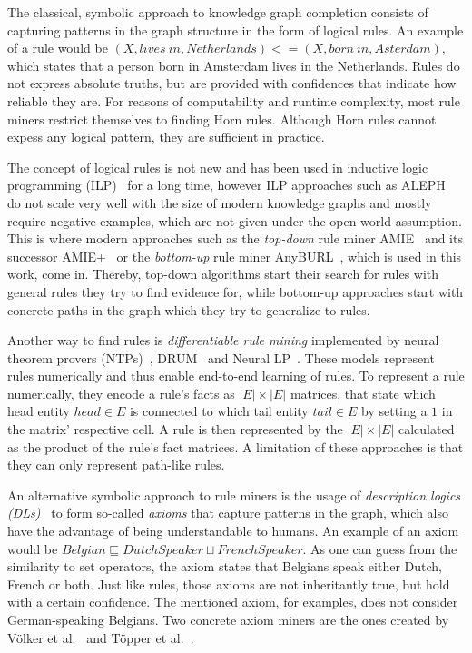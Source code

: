 The classical, symbolic approach to knowledge graph completion consists of capturing patterns in the graph structure in the form of logical rules. An example of a rule would be $(X, lives~in, Netherlands) <= (X, born~in, Asterdam)$, which states that a person born in Amsterdam lives in the Netherlands. Rules do not express absolute truths, but are provided with confidences that indicate how reliable they are. For reasons of computability and runtime complexity, most rule miners restrict themselves to finding Horn rules. Although Horn rules cannot expess any logical pattern, they are sufficient in practice.

The concept of logical rules is not new and has been used in inductive logic programming (ILP)~\cite{Muggleton1994InductiveLP} for a long time, however ILP approaches such as ALEPH~\cite{ALEPH} do not scale very well with the size of modern knowledge graphs and mostly require negative examples, which are not given under the open-world assumption. This is where modern approaches such as the \emph{top-down} rule miner AMIE~\cite{Galrraga2013AMIEAR} and its successor AMIE+~\cite{Galrraga2015FastRM} or the \emph{bottom-up} rule miner AnyBURL~\cite{Meilicke2019AnytimeBR}, which is used in this work, come in. Thereby, top-down algorithms start their search for rules with general rules they try to find evidence for, while bottom-up approaches start with concrete paths in the graph which they try to generalize to rules.

Another way to find rules is \emph{differentiable rule mining} implemented by neural theorem provers (NTPs)~\cite{Rocktschel2017EndtoendDP}, DRUM~\cite{Sadeghian2019DRUMED} and Neural LP~\cite{Yang2017DifferentiableLO}. These models represent rules numerically and thus enable end-to-end learning of rules. To represent a rule numerically, they encode a rule's facts as $|E| \times |E|$ matrices, that state which head entity $head \in E$ is connected to which tail entity $tail \in E$ by setting a $1$ in the matrix' respective cell. A rule is then represented by the $|E| \times |E|$ calculated as the product of the rule's fact matrices. A limitation of these approaches is that they can only represent path-like rules.

An alternative symbolic approach to rule miners is the usage of \emph{description logics (DLs)}~\cite{Baader2003TheDL} to form so-called \emph{axioms} that capture patterns in the graph, which also have the advantage of being understandable to humans. An example of an axiom would be $Belgian \sqsubseteq DutchSpeaker \sqcup FrenchSpeaker$. As one can guess from the similarity to set operators, the axiom states that Belgians speak either Dutch, French or both. Just like rules, those axioms are not inheritantly true, but hold with a certain confidence. The mentioned axiom, for examples, does not consider German-speaking Belgians. Two concrete axiom miners are the ones created by Völker et al.~\cite{Vlker2015AutomaticAO} and Töpper et al.~\cite{Tpper2012DBpediaOE}.
